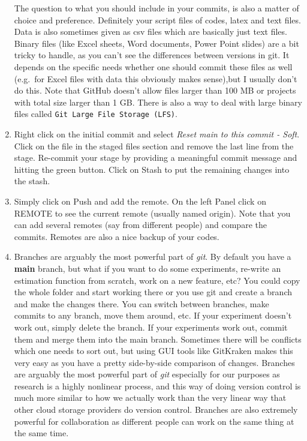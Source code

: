\begin{enumerate}
The question to what you should include in your commits, is also a matter of choice and preference.
Definitely your script files of codes, latex and text files.
Data is also sometimes given as csv files which are basically just text files.
Binary files (like Excel sheets, Word documents, Power Point slides) are a bit tricky to handle,
  as you can't see the differences between versions in git.
It depends on the specific needs whether one should commit these files as well (e.g.\ for Excel files with data this obviously makes sense),but I usually don't do this.
Note that GitHub doesn't allow files larger than 100 MB or projects with total size larger than 1 {GB}.
There is also a way to deal with large binary files called \texttt{Git Large File Storage (LFS)}.

\item
Right click on the initial commit and select \emph{Reset main to this commit {-} Soft}.
Click on the file in the staged files section and remove the last line from the stage.
Re-commit your stage by providing a meaningful commit message and hitting the green button.
Click on Stash to put the remaining changes into the stash.

\item
Simply click on Push and add the remote.
On the left Panel click on REMOTE to see the current remote (usually named origin).
Note that you can add several remotes (say from different people) and compare the commits.
Remotes are also a nice backup of your codes.

\item
Branches are arguably the most powerful part of \emph{git}.
By default you have a \textbf{main} branch,
  but what if you want to do some experiments, re-write an estimation function from scratch, work on a new feature, etc?
You could copy the whole folder and start working there or you use git and create a branch and make the changes there.
You can switch between branches, make commits to any branch, move them around, etc.
If your experiment doesn't work out, simply delete the branch.
If your experiments work out, commit them and merge them into the main branch.
Sometimes there will be conflicts which one needs to sort out,
  but using GUI tools like GitKraken makes this very easy
  as you have a pretty side-by-side comparison of changes.
Branches are arguably the most powerful part of \emph{git} especially for our purposes
  as research is a highly nonlinear process, and this way of doing version control is much more similar to how we actually work
  than the very linear way that other cloud storage providers do version control.
Branches are also extremely powerful for collaboration
  as different people can work on the same thing at the same time.


\end{enumerate}
